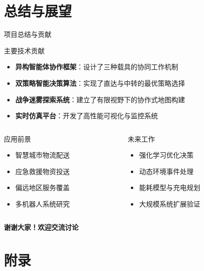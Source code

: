 \documentclass[
10pt,
aspectratio=169,
]{beamer}
\begin{document}
\section{总结与展望}

\begin{frame}{项目总结与贡献}
    \begin{block}{主要技术贡献}
        \begin{itemize}
            \item \textbf{异构智能体协作框架}：设计了三种载具的协同工作机制
            \item \textbf{双策略智能决策算法}：实现了直达与中转的最优策略选择
            \item \textbf{战争迷雾探索系统}：建立了有限视野下的协作式地图构建
            \item \textbf{实时仿真平台}：开发了高性能可视化与监控系统
        \end{itemize}
    \end{block}
    
    \begin{columns}
        \begin{column}{0.5\textwidth}
            \begin{exampleblock}{应用前景}
                \begin{itemize}
                    \item 智慧城市物流配送
                    \item 应急救援物资投送
                    \item 偏远地区服务覆盖
                    \item 多机器人系统研究
                \end{itemize}
            \end{exampleblock}
        \end{column}
        \begin{column}{0.5\textwidth}
            \begin{alertblock}{未来工作}
                \begin{itemize}
                    \item 强化学习优化决策
                    \item 动态环境事件处理
                    \item 能耗模型与充电规划
                    \item 大规模系统扩展验证
                \end{itemize}
            \end{alertblock}
        \end{column}
    \end{columns}
    
    \begin{center}
        \Large \textbf{谢谢大家！欢迎交流讨论}
    \end{center}
\end{frame}

\section{附录}

%
\end{document}
